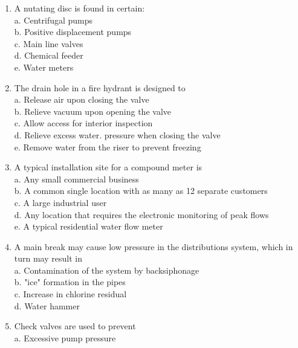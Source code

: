 \documentclass{article}
\begin{document}
\begin{enumerate}[1.]
\item A nutating disc is found in certain:\\
a.	Centrifugal pumps\\
b.	Positive displacement pumps\\
c.	Main line valves\\
d.	Chemical feeder\\
e.	Water meters\\

\item The drain hole in a fire hydrant is designed to\\
a.	Release air upon closing the valve\\
b.	Relieve vacuum upon opening the valve\\
c.	Allow access for interior inspection\\
d.	Relieve excess water. pressure when closing the valve\\
e.	Remove water from the riser to prevent freezing\\

\item A typical installation site for a compound meter is\\
a.	Any small commercial business\\
b.	A common single location with as many as 12 separate customers\\
c.	A large industrial user\\
d.	Any location that requires the electronic monitoring of peak flows\\
e.	A typical residential water flow meter\\


  \item A main break may cause low pressure in the distributions system, which in turn may result in\\

a. Contamination of the system by backsiphonage\\

b. "ice" formation in the pipes\\

c. Increase in chlorine residual\\

d. Water hammer\\

\item Check valves are used to prevent\\

a. Excessive pump pressure\\


\end{enumerate}
\end{document}
